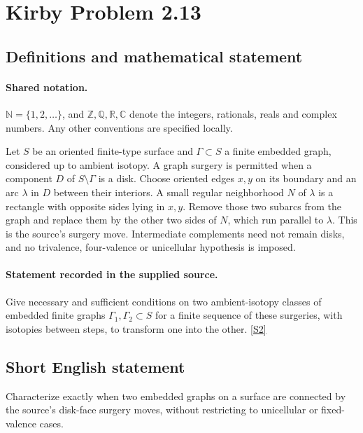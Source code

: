 \documentclass[11pt]{article}
\newcommand{\sref}[2]{\hyperlink{source:#1:#2}{[S#2]}}
\begin{document}
\section{Kirby Problem 2.13}\label{statement}

\subsection{Definitions and mathematical statement}

\paragraph{Shared notation.}$\mathbb N=\{1,2,\ldots\}$, and $\mathbb Z,\mathbb Q,\mathbb R,\mathbb C$ denote the integers, rationals, reals and complex numbers. Any other conventions are specified locally.


Let $S$ be an oriented finite-type surface and $\Gamma\subset S$ a finite embedded graph, considered up to ambient isotopy. A graph surgery is permitted when a component $D$ of $S\setminus\Gamma$ is a disk. Choose oriented edges $x,y$ on its boundary and an arc $\lambda$ in $D$ between their interiors. A small regular neighborhood $N$ of $\lambda$ is a rectangle with opposite sides lying in $x,y$. Remove those two subarcs from the graph and replace them by the other two sides of $N$, which run parallel to $\lambda$. This is the source's surgery move. Intermediate complements need not remain disks, and no trivalence, four-valence or unicellular hypothesis is imposed.
\paragraph{Statement recorded in the supplied source.}
Give necessary and sufficient conditions on two ambient-isotopy classes of embedded finite graphs $\Gamma_1,\Gamma_2\subset S$ for a finite sequence of these surgeries, with isotopies between steps, to transform one into the other. \sref{statement}{2}

\subsection{Short English statement}
Characterize exactly when two embedded graphs on a surface are connected by the source’s disk-face surgery moves, without restricting to unicellular or fixed-valence cases.
\end{document}

